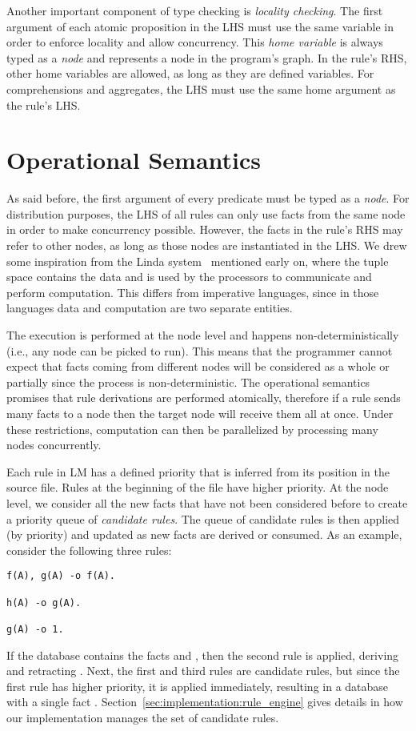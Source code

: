 Another important component of type checking is \emph{locality checking}. The
first argument of each atomic proposition in the LHS must use the same variable
in order to enforce locality and allow concurrency. This \emph{home variable} is
always typed as a \emph{node} and represents a node in the program's graph. In
the rule's RHS, other home variables are allowed, as long as they are defined
variables. For comprehensions and aggregates, the LHS must use the same home
argument as the rule's LHS.

\section{Operational Semantics}

As said before, the first argument of every predicate must be typed as a
\emph{node}.  For distribution purposes, the LHS of all rules can only use facts
from the same node in order to make concurrency possible. However, the facts in
the rule's RHS may refer to other nodes, as long as those nodes are instantiated
in the LHS. We drew some inspiration from the Linda system~\cite{linda}
mentioned early on, where the tuple space contains the data and is used by the
processors to communicate and perform computation. This differs from imperative
languages, since in those languages data and computation are two separate
entities.

The execution is performed at the node level and happens non-deterministically
(i.e., any node can be picked to run). This means that the programmer cannot
expect that facts coming from different nodes will be considered as a whole or
partially since the process is non-deterministic. The operational semantics
promises that rule derivations are performed atomically, therefore if a rule
sends many facts to a node then the target node will receive them all at once.
Under these restrictions, computation can then be parallelized by processing
many nodes concurrently.

Each rule in LM has a defined priority that is inferred from its position in the
source file.  Rules at the beginning of the file have higher priority. At the
node level, we consider all the new facts that have not been considered before
to create a priority queue of \emph{candidate rules}. The queue of candidate
rules is then applied (by priority) and updated as new facts are derived or
consumed. As an example, consider the following three rules:

\begin{Verbatim}[fontsize=\codesize]
f(A), g(A) -o f(A).

h(A) -o g(A).

g(A) -o 1.
\end{Verbatim}

If the database contains the facts  and , then the
second rule is applied, deriving  and retracting . Next,
the first and third rules are candidate rules, but since the first rule has
higher priority, it is applied immediately, resulting in a database with a
single fact .  Section~\ref{sec:implementation:rule_engine} gives
details in how our implementation manages the set of candidate rules.

